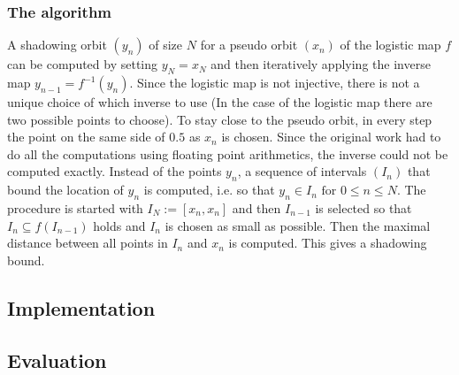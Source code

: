     \subsubsection{The algorithm}
  A shadowing orbit $(y_n)$ of size $N$ for a pseudo orbit $(x_n)$ of the logistic map $f$ can be computed by setting $y_N = x_N$ and then iteratively applying the inverse map $y_{n-1} = f^{-1}(y_n)$. Since the logistic map is not injective, there is not a unique choice of which inverse to use (In the case of the logistic map there are two possible points to choose). 
  To stay close to the pseudo orbit, in every step the point on the same side of $0.5$ as $x_n$ is chosen.   
  Since the original work had to do all the computations using floating point arithmetics, the inverse could not be computed exactly.
  Instead of the points $y_n$, a sequence of intervals $(I_n)$ that bound the location of $y_n$ is computed, i.e. so that $y_n \in I_n \text{ for } 0 \leq n \leq N$.
  The procedure is started with $I_N := [x_n, x_n]$ and then $I_{n-1}$ is selected so that $I_n \subseteq f(I_{n-1})$ holds and $I_n$ is chosen as small as possible. 
  Then the maximal distance between all points in $I_n$ and $x_n$ is computed.
  This gives a shadowing bound.
  \subsection{Implementation}


  \subsection{Evaluation}